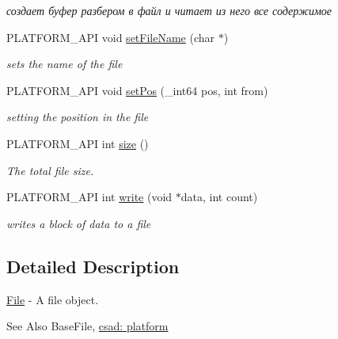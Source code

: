 \begin{DoxyCompactItemize}
\begin{DoxyCompactList}\small\item\em создает буфер разбером в файл и читает из него все содержимое \end{DoxyCompactList}\item 
\hypertarget{classcsad_1_1_file_ae7a246a527ba8244fed41306e792b378}{P\-L\-A\-T\-F\-O\-R\-M\-\_\-\-A\-P\-I void \hyperlink{classcsad_1_1_file_ae7a246a527ba8244fed41306e792b378}{set\-File\-Name} (char $\ast$)}\label{classcsad_1_1_file_ae7a246a527ba8244fed41306e792b378}

\begin{DoxyCompactList}\small\item\em sets the name of the file \end{DoxyCompactList}\item 
P\-L\-A\-T\-F\-O\-R\-M\-\_\-\-A\-P\-I void \hyperlink{classcsad_1_1_file_a074a0069210cada3471ef35b7ef3df68}{set\-Pos} (\-\_\-int64 pos, int from)
\begin{DoxyCompactList}\small\item\em setting the position in the file \end{DoxyCompactList}\item 
P\-L\-A\-T\-F\-O\-R\-M\-\_\-\-A\-P\-I int \hyperlink{classcsad_1_1_file_a323a9a7301bb03b24d9753cc31c3f931}{size} ()
\begin{DoxyCompactList}\small\item\em The total file size. \end{DoxyCompactList}\item 
P\-L\-A\-T\-F\-O\-R\-M\-\_\-\-A\-P\-I int \hyperlink{classcsad_1_1_file_adadb7c4c353357a26fa7d6f6bc687d2f}{write} (void $\ast$data, int count)
\begin{DoxyCompactList}\small\item\em writes a block of data to a file \end{DoxyCompactList}\end{DoxyCompactItemize}


\subsection{Detailed Description}
\hyperlink{classcsad_1_1_file}{File} -\/ A file object. 

\begin{DoxySeeAlso}{See Also}
Base\-File, \hyperlink{group__platform}{csad\-: platform} 
\end{DoxySeeAlso}


